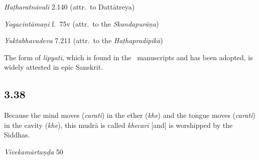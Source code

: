 \begin{ekdosis}
\begin{testimonia}[hp03_037]
\emph{Haṭharatnāvalī} 2.140 (attr.~to Dattātreya)
\begin{versinnote}
\end{versinnote}

\emph{Yogacintāmaṇi} f.~75v (attr.~to the \emph{Skandapurāṇa})
\begin{versinnote}
\end{versinnote}

\emph{Yuktabhavadeva} 7.211 (attr.~to the \emph{Haṭhapradīpikā})
\begin{versinnote}
\end{versinnote}
\end{testimonia}

\begin{philcomm}[hp03_037]
The form of \emph{lipyati}, which is found in the \alpha \ manuscripts and has been adopted, is widely attested in epic Sanskrit.
\end{philcomm}

\subsection*{3.38}
\begin{translation}[hp03_038]
Because the mind moves (\emph{carati}) in the ether (\emph{khe}) and the tongue moves (\emph{carati}) in the cavity (\emph{khe}), this mudrā is called \emph{khecarī} [and] is worshipped by the Siddhas.
\end{translation}

\begin{sources}[hp03_038]
\emph{Vivekamārtaṇḍa} 50
\begin{versinnote}
\tl{\var{37c tenaiṣā ] tenaiva, teneyaṃ \vl 37cd nāma mudrā ] mudrā sarva° \vl}\\!}
\end{versinnote}
\end{sources}


\end{ekdosis}
